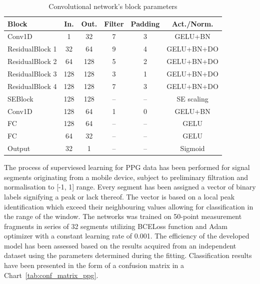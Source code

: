 \documentclass[journal]{IEEEtran}
\begin{document}
{%
\begin{table}[ht]
\centering
\caption{Convolutional network's block parameters}
\label{tab:ppg_layers}
\begin{tabular}{|l|c|c|c|c|c|}
\hline
\textbf{Block} & \textbf{In.} & \textbf{Out.} & \textbf{Filter} & \textbf{Padding} & \textbf{Act./Norm.} \\
\hline
Conv1D & 1 & 32 & 7 & 3 & GELU+BN \\
ResidualBlock 1 & 32 & 64 & 9 & 4 & GELU+BN+DO \\
ResidualBlock 2 & 64 & 128 & 5 & 2 & GELU+BN+DO \\
ResidualBlock 3 & 128 & 128 & 3 & 1 & GELU+BN+DO\\
ResidualBlock 4 & 128 & 128 & 7 & 3 & GELU+BN+DO \\
SEBlock & 128 & 128 & – & – & SE scaling \\
Conv1D  & 128 & 64 & 1 & 0 & GELU+BN \\
FC & 128 & 64 & – & – & GELU \\
FC & 64 & 32 & – & – & GELU \\
Output & 32 & 1 & – & – & Sigmoid \\
\hline
\end{tabular}
\end{table}

The process of superviesed learning for PPG data has been performed for signal segments originating from a mobile device, subject to preliminary filtration and normalisation to [-1, 1] range. Every segment has been assigned a vector of binary labels signifying a peak or lack thereof. The vector is based on a local peak identification which exceed their neighbouring values allowing for classification in the range of the window. The networks was trained on 50-point measurement fragments in series of 32 segments utilizing BCELoss function and Adam optimizer with a constant learning rate of 0.001. The efficiency of the developed model has been assessed based on the results acquired from an independent dataset using the parameters determined during the fitting. Classification results have been presented in the form of a confusion matrix in a Chart~\ref{tab:conf_matrix_ppg}.

}
\end{document}
